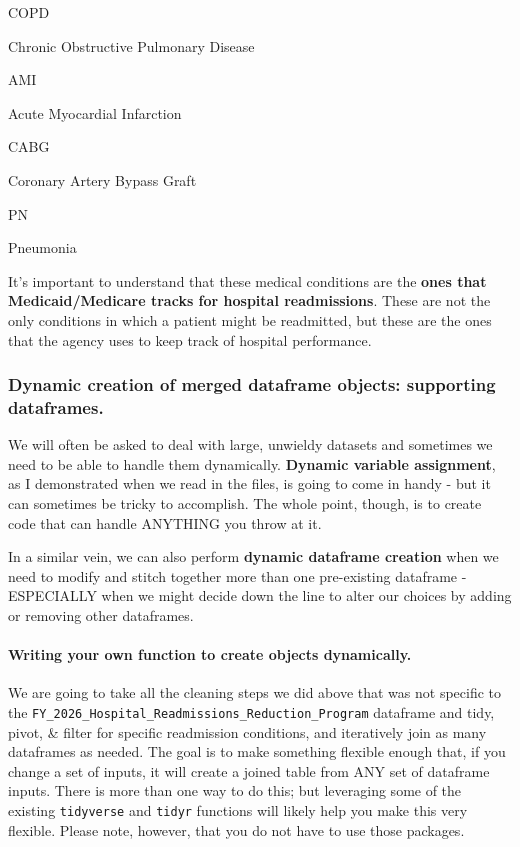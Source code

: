 \documentclass[
]{article}
\begin{document}
COPD

Chronic Obstructive Pulmonary Disease

AMI

Acute Myocardial Infarction

CABG

Coronary Artery Bypass Graft

PN

Pneumonia

It's important to understand that these medical conditions are the
\textbf{ones that Medicaid/Medicare tracks for hospital readmissions}.
These are not the only conditions in which a patient might be
readmitted, but these are the ones that the agency uses to keep track of
hospital performance.

\subsubsection{Dynamic creation of merged dataframe objects: supporting
dataframes.}\label{dynamic-creation-of-merged-dataframe-objects-supporting-dataframes.}

We will often be asked to deal with large, unwieldy datasets and
sometimes we need to be able to handle them dynamically. \textbf{Dynamic
variable assignment}, as I demonstrated when we read in the files, is
going to come in handy - but it can sometimes be tricky to accomplish.
The whole point, though, is to create code that can handle ANYTHING you
throw at it.

In a similar vein, we can also perform \textbf{dynamic dataframe
creation} when we need to modify and stitch together more than one
pre-existing dataframe - ESPECIALLY when we might decide down the line
to alter our choices by adding or removing other dataframes.

\paragraph{Writing your own function to create objects
dynamically.}\label{writing-your-own-function-to-create-objects-dynamically.}

We are going to take all the cleaning steps we did above that was not
specific to the
\texttt{FY\_2026\_Hospital\_Readmissions\_Reduction\_Program} dataframe
and tidy, pivot, \& filter for specific readmission conditions, and
iteratively join as many dataframes as needed. The goal is to make
something flexible enough that, if you change a set of inputs, it will
create a joined table from ANY set of dataframe inputs. There is more
than one way to do this; but leveraging some of the existing
\texttt{tidyverse} and \texttt{tidyr} functions will likely help you
make this very flexible. Please note, however, that you do not have to
use those packages.
\end{document}
